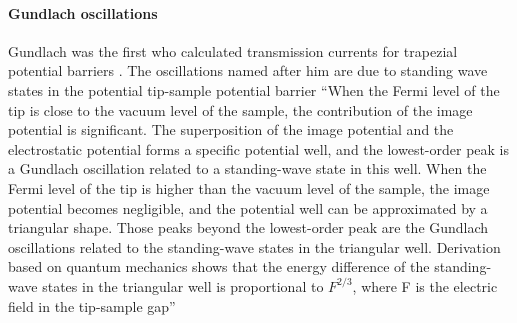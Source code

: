\paragraph{Gundlach oscillations}
Gundlach was the first who calculated transmission currents for trapezial potential barriers \cite{gundlach_zur_1966}. The oscillations named after him are due to standing wave states in the potential tip-sample potential barrier \cite{binnig_tunneling_1985,becker_electron_1985}
``When the Fermi level of the tip is close to the vacuum level of  the  sample,  the  contribution  of  the  image  potential  is significant. The superposition of the  image  potential  and the electrostatic  potential forms a specific potential well, and the lowest-order peak is a Gundlach oscillation related to a standing-wave state in this well. When the Fermi level of the tip is higher than the vacuum level of the sample, the image potential becomes negligible, and the potential well can be  approximated  by a triangular  shape. Those peaks beyond the lowest-order peak are the Gundlach oscillations related to the standing-wave states in the triangular well. Derivation  based  on  quantum  mechanics  shows  that  the energy difference of the standing-wave states in the triangular  well  is  proportional  to $F^{2/3}$,  where F is  the electric field in the tip-sample gap''\cite{lin_manifestation_2007}